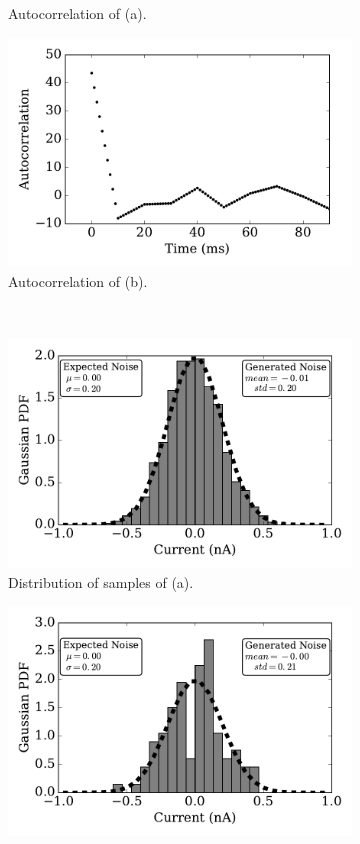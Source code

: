 \begin{figure}[tbp!]
\begin{subfigure}[t]{0.43\textwidth}
			\caption{Autocorrelation of (a).}
		\end{subfigure}
		\begin{subfigure}[t]{0.43\textwidth}
			\includegraphics[width=\textwidth]{pics_iconip/autocorr_dt10.pdf}
			\caption{Autocorrelation of (b).}
		\end{subfigure}\\
		\begin{subfigure}[t]{0.43\textwidth}
			\includegraphics[width=\textwidth]{pics_iconip/distr_dt1.pdf}
			\caption{Distribution of samples of (a).}
		\end{subfigure}
		\begin{subfigure}[t]{0.43\textwidth}
			\includegraphics[width=\textwidth]{pics_iconip/distr_dt10.pdf}

\end{subfigure}
\end{figure}
